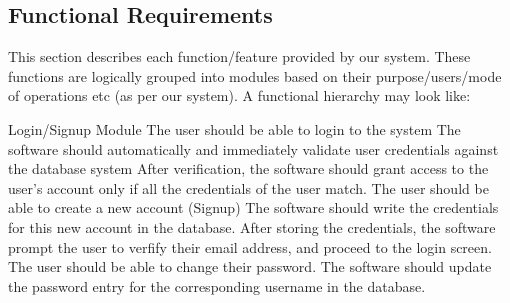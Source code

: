 \subsection{Functional Requirements}

This section describes each function/feature provided by our system. These functions are logically grouped into modules based on their purpose/users/mode of operations etc (as per our system). A functional hierarchy may look like:

\begin{outline}

  \1 Login/Signup Module
  \2 The user should be able to login to the system
    \3 The software should automatically and immediately validate user credentials against the database system
    \3 After verification, the software should grant access to the user’s account only if all the credentials of the user match. 
  \2 The user should be able to create a new account (Signup)
    \3 The software should write the credentials for this new account in the database.
    \3 After storing the credentials, the software prompt the user to verfify their email address, and proceed to the login screen.
  \2 The user should be able to change their password.
    \3 The software should update the password entry for the corresponding username in the database. 


\end{outline}
